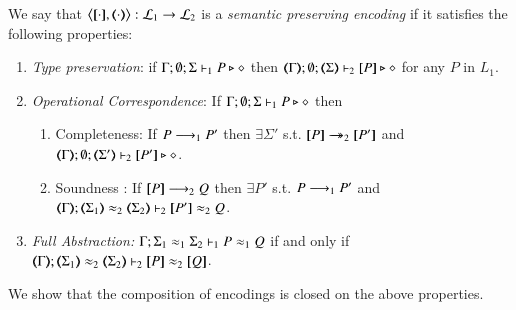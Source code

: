 
\begin{definition}\rm
	\label{def:ep}
	We say that $\enc{\cdot}{\cdot} : \tyl{L}_1 \to \tyl{L}_2$ is a \emph{semantic preserving encoding}
	if it satisfies the following properties:
	
	\begin{enumerate}[1.]
		\item \emph{Type preservation}:
		if
			$\Gamma; \emptyset; \Sigma \vdash_1 P \triangleright \diamond$ then $\mapt{\Gamma}; \emptyset; \mapt{\Sigma} \proves_2 \map{P} \hastype \Proc$ for any   $P$ in $L_1$.

		\item \emph{Operational Correspondence}: If $\Gamma; \emptyset; \Sigma \vdash_1 P \triangleright \diamond$ then
		\begin{enumerate}[-]
			\item	Completeness: If $P \longrightarrow_1 P'$ then $\exists \Sigma'$ s.t.
				$\map{P} \Red_2 \map{P'}$ and
				$\mapt{\Gamma}; \emptyset; \mapt{\Sigma'} \proves_2 \map{P'} \hastype \Proc$.
			\item Soundness : If $[\!\![P]\!\!] \longrightarrow_2 Q$ then
				$\exists P'$ s.t. $P \longrightarrow_1 P'$ and \\
				$\mapt{\Gamma}; \mapt{\Sigma_1} \wb_2 \mapt{\Sigma_2} \proves_2 \map{P'} \wb_2 Q$.
		\end{enumerate}
		
		\item \emph{Full Abstraction:}
		$\Gamma; \Sigma_1 \approx_1 \Sigma_2 \vdash_1 P \approx_1 Q $ if and only if $\mapt{\Gamma}; \mapt{\Sigma_1} \wb_2 \mapt{\Sigma_2} \proves_2 \map{P} \wb_2 \map{Q} $.
	\end{enumerate}
\end{definition}


We show that the composition of encodings is closed on the above properties.

